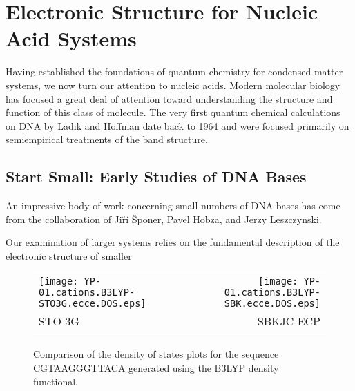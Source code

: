 \chapter[Nucleic Acid Systems]{Electronic Structure for Nucleic Acid Systems}

Having established the foundations of quantum chemistry for condensed
matter systems, we now turn our attention to nucleic acids.  Modern
molecular biology has focused a great deal of attention toward
understanding the structure and function of this class of molecule.
The very first quantum chemical calculations on DNA\cite{LADIK1964} by
Ladik and Hoffman date back to 1964 and were focused primarily on
semiempirical treatments of the band structure.



\section{Start Small:  Early Studies of DNA Bases}
An impressive body of work concerning small numbers of DNA bases has
come from the collaboration of Ji\u{r}\'{i} \v{S}poner, Pavel Hobza,
and Jerzy
Leszczynski.\cite{Sponer1994,Sponer2001a,Sponer02,Reha02,Sponer04,Sponer2005a,Perez2005,Kabelac2007}

Our examination of larger systems relies on the fundamental
description of the electronic structure of smaller

\begin{figure}[tb]
  \newlength{\panelwidth}
  \setlength{\panelwidth}{0.485\textwidth}
  \newlength{\capwidth}
  \setlength{\capwidth}{\textwidth}
  \begin{tabular}{lr}
    \begin{minipage}{\panelwidth}
      \texttt{[image: YP-01.cations.B3LYP-STO3G.ecce.DOS.eps]}
    \end{minipage} &
    \begin{minipage}{\panelwidth}
      \texttt{[image: YP-01.cations.B3LYP-SBK.ecce.DOS.eps]}
    \end{minipage} \\
    \begin{minipage}{\panelwidth}\centering STO-3G\end{minipage} &
    \begin{minipage}{\panelwidth}\centering SBKJC ECP\end{minipage}\\[4ex]
    \multicolumn{2}{c}{
    \begin{minipage}{\capwidth}
        \caption{Comparison of the density of states plots for the
        sequence CGTAAGGGTTACA generated using the B3LYP density
        functional.
        \label{Fig:DOS_Comparison}}
    \end{minipage}} \\
  \end{tabular}
\end{figure}

